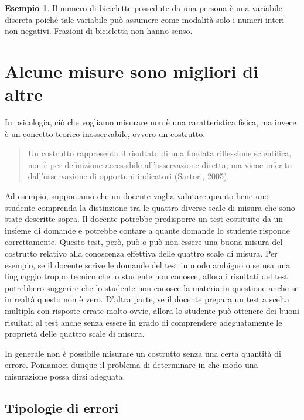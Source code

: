 \documentclass[
]{memoir}
\theoremstyle{definition}
\theoremstyle{definition}
\newtheorem{example}{Esempio}[chapter]
\theoremstyle{definition}
\theoremstyle{definition}
\theoremstyle{remark}
\begin{document}
\begin{example}
Il numero di biciclette possedute da una persona è una variabile discreta poiché tale variabile può assumere come modalità solo i numeri interi non negativi. Frazioni di bicicletta non hanno senso.
\end{example}

\hypertarget{alcune-misure-sono-migliori-di-altre}{%
\section{Alcune misure sono migliori di altre}\label{alcune-misure-sono-migliori-di-altre}}

In psicologia, ciò che vogliamo misurare non è una caratteristica fisica, ma invece è un concetto teorico inosservabile, ovvero un costrutto.

\begin{quote}
Un costrutto rappresenta il risultato di una fondata riflessione scientifica, non è per definizione accessibile all'osservazione diretta, ma viene inferito dall'osservazione di opportuni indicatori (Sartori, 2005).
\end{quote}

Ad esempio, supponiamo che un docente voglia valutare quanto bene uno studente comprenda la distinzione tra le quattro diverse scale di misura che sono state descritte sopra. Il docente potrebbe predisporre un test costituito da un insieme di domande e potrebbe
contare a quante domande lo studente risponde correttamente. Questo
test, però, può o può non essere una buona misura del costrutto relativo
alla conoscenza effettiva delle quattro scale di misura. Per esempio, se
il docente scrive le domande del test in modo ambiguo o se usa una
linguaggio troppo tecnico che lo studente non conosce, allora i
risultati del test potrebbero suggerire che lo studente non conosce la
materia in questione anche se in realtà questo non è vero. D'altra
parte, se il docente prepara un test a scelta multipla con risposte
errate molto ovvie, allora lo studente può ottenere dei buoni risultati
al test anche senza essere in grado di comprendere adeguatamente le
proprietà delle quattro scale di misura.

In generale non è possibile misurare un costrutto senza una certa
quantità di errore. Poniamoci dunque il problema di determinare in che
modo una misurazione possa dirsi adeguata.

\hypertarget{tipologie-di-errori}{%
\subsection{Tipologie di errori}\label{tipologie-di-errori}}
\end{document}
